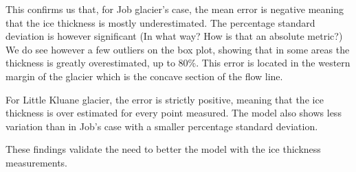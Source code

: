 \documentclass[a4, 12pt]{article}
\begin{document}
This confirms us that, for Job glacier's case, the mean error is negative meaning that the ice thickness is mostly underestimated. The percentage standard deviation is however significant (In what way? How is that an absolute metric?) We do see however a few outliers on the box plot, showing that in some areas the thickness is greatly overestimated, up to 80\%. This error is located in the western margin of the glacier which is the concave section of the flow line.

For Little Kluane glacier, the error is strictly positive, meaning that the ice thickness is over estimated for every point measured. The model also shows less variation than in Job's case with a smaller percentage standard deviation.

These findings validate the need to better the model with the ice thickness measurements.



\end{document}
